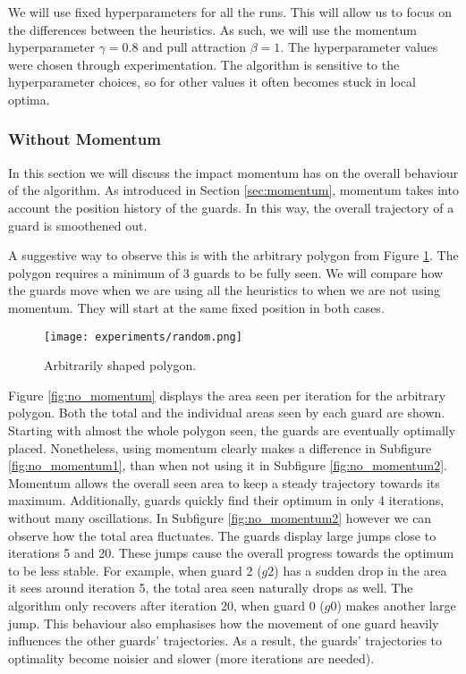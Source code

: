 We will use fixed hyperparameters for all the runs. This will allow us to focus on the differences between the heuristics. 
As such, we will use the momentum hyperparameter $\gamma = 0.8$ and pull attraction $\beta = 1$. The hyperparameter values were chosen through experimentation. The algorithm is sensitive to the hyperparameter choices, so for other values it often becomes stuck in local optima.

\subsubsection{Without Momentum}
In this section we will discuss the impact momentum has on the overall behaviour of the algorithm. As introduced in Section \ref{sec:momentum}, momentum takes into account the position history of the guards. In this way, the overall trajectory of a guard is smoothened out.

A suggestive way to observe this is with the arbitrary polygon from Figure \ref{fig:random}. The polygon requires a minimum of 3 guards to be fully seen. We will compare how the guards move when we are using all the heuristics to when we are not using momentum. They will start at the same fixed position in both cases.

\begin{figure}[h!]
    \centering
    \texttt{[image: experiments/random.png]}
    \caption{Arbitrarily shaped polygon.}
    \label{fig:random}
\end{figure}

Figure \ref{fig:no_momentum} displays the area seen per iteration for the arbitrary polygon. Both the total and the individual areas seen by each guard are shown. Starting with almost the whole polygon seen, the guards are eventually optimally placed. Nonetheless, using momentum clearly makes a difference in Subfigure \ref{fig:no_momentum1}, than when not using it in Subfigure \ref{fig:no_momentum2}. Momentum allows the overall seen area to keep a steady trajectory towards its maximum. Additionally, guards quickly find their optimum in only 4 iterations, without many oscillations. In Subfigure \ref{fig:no_momentum2} however we can observe how the total area fluctuates. The guards display large jumps close to iterations 5 and 20. These jumps cause the overall progress towards the optimum to be less stable. For example, when guard 2 ($g2$) has a sudden drop in the area it sees around iteration 5, the total area seen naturally drops as well. The algorithm only recovers after iteration 20, when guard 0 ($g0$) makes another large jump. This behaviour also emphasises how the movement of one guard heavily influences the other guards' trajectories. As a result, the guards' trajectories to optimality become noisier and slower (more iterations are needed).


